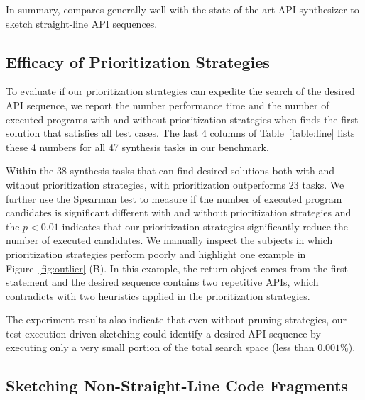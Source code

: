 In summary, \tool compares generally well with the state-of-the-art API synthesizer to sketch straight-line API sequences. 


\subsection{Efficacy of Prioritization Strategies}\label{sec:strategyEval}

To evaluate if our prioritization strategies can expedite the search of the desired API sequence, we report the number performance time and the number of executed programs with and without prioritization strategies when \tool finds the first solution that satisfies all test cases.  The last 4 columns of Table~\ref{table:line} lists these 4 numbers for all 47 synthesis tasks in our benchmark. 

Within the 38 synthesis tasks that \tool can find desired solutions both with and without prioritization strategies, \tool with prioritization outperforms 23 tasks.    
  We further use the Spearman test to measure if the number of executed program candidates is significant different with and without prioritization strategies and the $p<0.01$ indicates that our prioritization strategies significantly reduce the number of executed candidates. We manually inspect the subjects in which prioritization strategies perform poorly and highlight one example in Figure~\ref{fig:outlier} (B).   In this example, the return object comes from the first statement and the desired sequence contains two repetitive APIs, which contradicts with two heuristics applied in the prioritization strategies. 

The experiment results also indicate that even without pruning strategies, our test-execution-driven sketching could identify a desired API sequence by executing only a very small portion of the total search space (less than $0.001\%$). 



\subsection{Sketching Non-Straight-Line Code Fragments}~\label{sec:branch}

